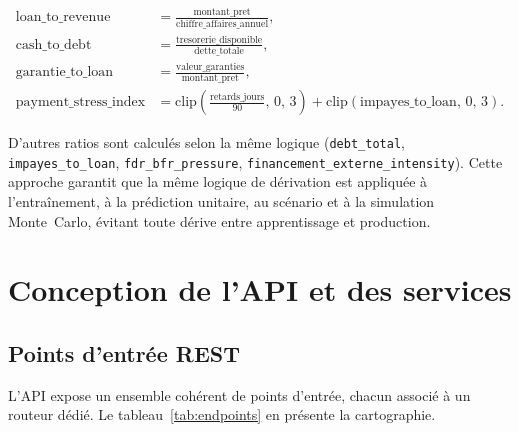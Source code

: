 \documentclass[a4paper,12pt,oneside]{report}
\begin{document}
\begin{align}
  \text{loan\_to\_revenue}
    &= \frac{\text{montant\_pret}}{\text{chiffre\_affaires\_annuel}}, \\[4pt]
  \text{cash\_to\_debt}
    &= \frac{\text{tresorerie\_disponible}}{\text{dette\_totale}}, \\[4pt]
  \text{garantie\_to\_loan}
    &= \frac{\text{valeur\_garanties}}{\text{montant\_pret}}, \\[4pt]
  \text{payment\_stress\_index}
    &= \mathrm{clip}\!\left(\tfrac{\text{retards\_jours}}{90},\,0,\,3\right)
     + \mathrm{clip}\!\left(\text{impayes\_to\_loan},\,0,\,3\right).
\end{align}

D'autres ratios sont calculés selon la même logique (\texttt{debt\_total},
\texttt{impayes\_to\_loan}, \texttt{fdr\_bfr\_pressure},
\texttt{financement\_externe\_intensity}). Cette approche garantit que la
même logique de dérivation est appliquée à l'entraînement, à la prédiction
unitaire, au scénario et à la simulation Monte~Carlo, évitant toute dérive entre
apprentissage et production.

\section{Conception de l'API et des services}

\subsection{Points d'entrée REST}

L'API expose un ensemble cohérent de points d'entrée, chacun associé à un routeur
dédié. Le tableau~\ref{tab:endpoints} en présente la cartographie.
\end{document}
